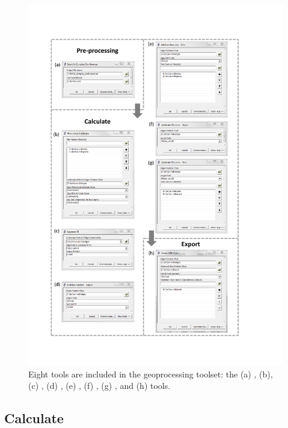 \documentclass[article]{jss}
\begin{document}
\begin{figure}[htbp]
  \begin{center}
    \includegraphics[width=390pt,keepaspectratio]{Figures/Fig5.pdf}
  \end{center}
\caption{Eight tools are included in the  geoprocessing toolset: the (a)
, (b),
(c) , (d) , (e) , (f) , (g) , and (h)
 tools.  \label{Fig5}}
\end{figure}

\subsection{Calculate}
\end{document}
